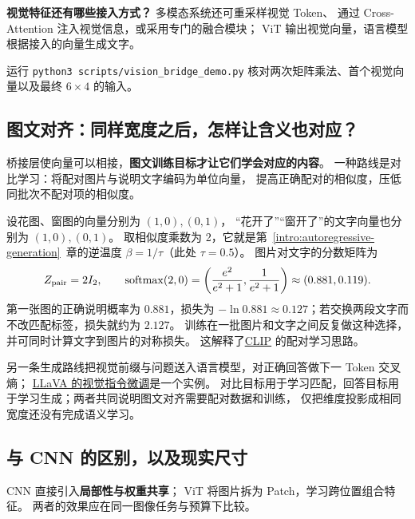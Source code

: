 

\begin{boundarybox}
\textbf{视觉特征还有哪些接入方式？}
多模态系统还可重采样视觉 Token、
通过 Cross-Attention 注入视觉信息，或采用专门的融合模块；
ViT 输出视觉向量，语言模型根据接入的向量生成文字。
\end{boundarybox}

运行 \texttt{python3 scripts/vision\_bridge\_demo.py}
核对两次矩阵乘法、首个视觉向量以及最终 $6\times4$ 的输入。

\subsection{图文对齐：同样宽度之后，怎样让含义也对应？}
\label{concept:vision-language-alignment}

桥接层使向量可以相接，\textbf{图文训练目标才让它们学会对应的内容}。
一种路线是对比学习：将配对图片与说明文字编码为单位向量，
提高正确配对的相似度，压低同批次不配对项的相似度。

设花图、窗图的向量分别为 $(1,0),(0,1)$，
“花开了”“窗开了”的文字向量也分别为 $(1,0),(0,1)$。
取相似度乘数为 2，它就是第~\ref*{intro:autoregressive-generation}~章的逆温度 $\beta=1/\tau$（此处 $\tau=0.5$）。
图片对文字的分数矩阵为
\[
Z_{\rm pair}=2I_2,\qquad
\operatorname{softmax}(2,0)=\left(\frac{e^2}{e^2+1},\frac1{e^2+1}\right)
\approx(0.881,0.119).
\]
第一张图的正确说明概率为 $0.881$，损失为
$-\ln0.881\approx0.127$；若交换两段文字而不改匹配标签，损失就约为 $2.127$。
训练在一批图片和文字之间反复做这种选择，并可同时计算文字到图片的对称损失。
\label{concept:clip}这解释了\href{https://arxiv.org/abs/2103.00020}{CLIP} 的配对学习思路。

另一条生成路线把视觉前缀与问题送入语言模型，对正确回答做下一 Token 交叉熵；
\href{https://arxiv.org/abs/2304.08485}{LLaVA 的视觉指令微调}是一个实例。
对比目标用于学习匹配，回答目标用于学习生成；两者共同说明图文对齐需要配对数据和训练，
仅把维度投影成相同宽度还没有完成语义学习。

\par{}
\subsection{与 CNN 的区别，以及现实尺寸}

CNN 直接引入\textbf{局部性与权重共享}；
ViT 将图片拆为 Patch，学习跨位置组合特征。
两者的效果应在同一图像任务与预算下比较。

